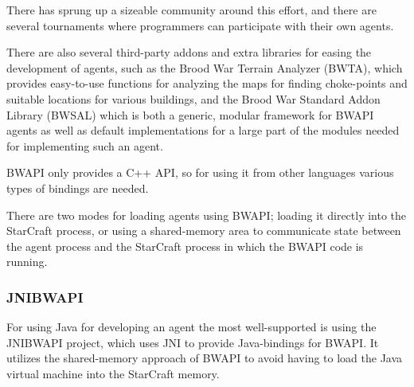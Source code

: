 There has sprung up a sizeable community around this effort, and there are several tournaments where programmers can participate with their own agents.\cite{bwapi}

There are also several third-party addons and extra libraries for easing the development of agents, such as the Brood War Terrain Analyzer (BWTA), which provides easy-to-use functions for analyzing the maps for finding choke-points and suitable locations for various buildings,\cite{bwta} and the Brood War Standard Addon Library (BWSAL) which is both a generic, modular framework for BWAPI agents as well as default implementations for a large part of the modules needed for implementing such an agent.\cite{bwsal}

BWAPI only provides a C++ API, so for using it from other languages various types of bindings are needed.

There are two modes for loading agents using BWAPI; loading it directly into the StarCraft process, or using a shared-memory area to communicate state between the agent process and the StarCraft process in which the BWAPI code is running.\cite{bwapi}

\subsubsection{JNIBWAPI}
For using Java for developing an agent the most well-supported is using the JNIBWAPI project, which uses JNI to provide Java-bindings for BWAPI. It utilizes the shared-memory approach of BWAPI to avoid having to load the Java virtual machine into the StarCraft memory.
